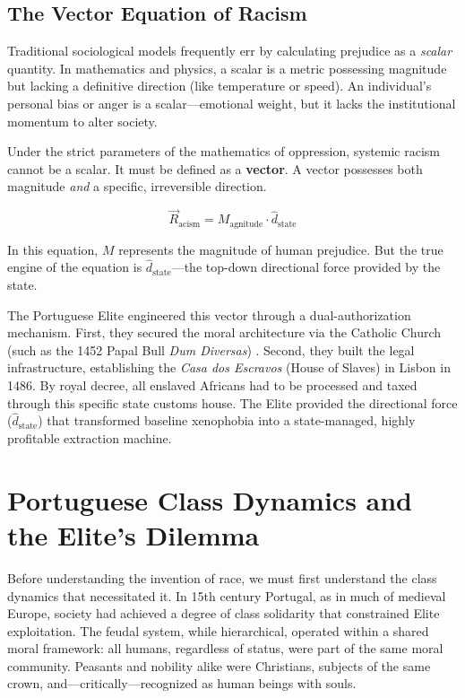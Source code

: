 \documentclass[12pt,openany]{book}
\begin{document}
\subsection{The Vector Equation of Racism}

Traditional sociological models frequently err by calculating prejudice as a \textit{scalar} quantity. In mathematics and physics, a scalar is a metric possessing magnitude but lacking a definitive direction (like temperature or speed). An individual's personal bias or anger is a scalar---emotional weight, but it lacks the institutional momentum to alter society.

Under the strict parameters of the mathematics of oppression, systemic racism cannot be a scalar. It must be defined as a \textbf{vector}. A vector possesses both magnitude \textit{and} a specific, irreversible direction.

\[
\vec{R}_{\text{acism}} = M_{\text{agnitude}} \cdot \hat{d}_{\text{state}}
\]

In this equation, $M$ represents the magnitude of human prejudice. But the true engine of the equation is $\hat{d}_{\text{state}}$---the top-down directional force provided by the state.

The Portuguese Elite engineered this vector through a dual-authorization mechanism. First, they secured the moral architecture via the Catholic Church (such as the 1452 Papal Bull \textit{Dum Diversas}) \cite{dumdiversas}. Second, they built the legal infrastructure, establishing the \textit{Casa dos Escravos} (House of Slaves) in Lisbon in 1486. By royal decree, all enslaved Africans had to be processed and taxed through this specific state customs house. The Elite provided the directional force ($\hat{d}_{\text{state}}$) that transformed baseline xenophobia into a state-managed, highly profitable extraction machine.

\section{Portuguese Class Dynamics and the Elite's Dilemma}

Before understanding the invention of race, we must first understand the class dynamics that necessitated it. In 15th century Portugal, as in much of medieval Europe, society had achieved a degree of class solidarity that constrained Elite exploitation. The feudal system, while hierarchical, operated within a shared moral framework: all humans, regardless of status, were part of the same moral community. Peasants and nobility alike were Christians, subjects of the same crown, and---critically---recognized as human beings with souls.
\end{document}
